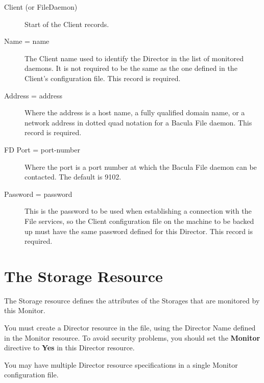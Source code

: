 \begin{description}

\item [Client (or FileDaemon)]
   Start of the Client records.  

\item [Name = \lt{}name\gt{}]
   The Client name used to identify  the Director in the list of monitored
daemons. It is not required  to be the same as the one defined in the Client's
configuration file.  This record is required.  

\item [Address = \lt{}address\gt{}]
   Where the address is a host  name, a fully qualified domain name, or a network
address in  dotted quad notation for a Bacula File daemon.  This record is
required. 

\item [FD Port = \lt{}port-number\gt{}]
   Where the port is a port  number at which the Bacula File daemon can be
contacted.  The default is 9102. 

\item [Password = \lt{}password\gt{}]
   This is the password to be  used when establishing a connection with the File
services, so  the Client configuration file on the machine to be backed up
must  have the same password defined for this Director. This record is 
required. 
\end{description}

\section{The Storage Resource}
\label{StorageResource1}

The Storage resource defines the attributes of the Storages that are monitored
by this Monitor.

You must create a Director resource in the 
 file, using the
Director Name defined in the Monitor resource. To avoid security problems, you
should set the {\bf Monitor} directive to {\bf Yes} in this Director resource.


You may have multiple Director resource specifications in a single Monitor
configuration file. 

